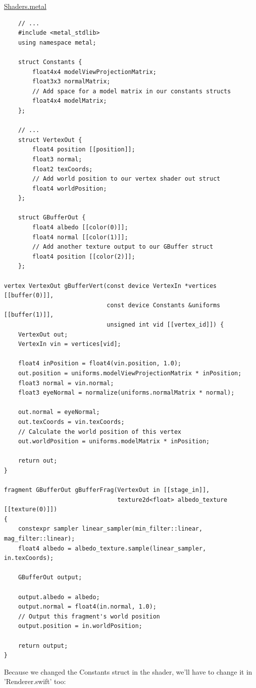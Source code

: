\documentclass[11pt]{article}
\begin{document}
\uline{Shaders.metal}
\begin{verbatim}
    // ...
    #include <metal_stdlib>
    using namespace metal;

    struct Constants {
        float4x4 modelViewProjectionMatrix;
        float3x3 normalMatrix;
        // Add space for a model matrix in our constants structs
        float4x4 modelMatrix;
    };

    // ...
    struct VertexOut {
        float4 position [[position]];
        float3 normal;
        float2 texCoords;
        // Add world position to our vertex shader out struct
        float4 worldPosition;
    };

    struct GBufferOut {
        float4 albedo [[color(0)]];
        float4 normal [[color(1)]];
        // Add another texture output to our GBuffer struct
        float4 position [[color(2)]];
    };

vertex VertexOut gBufferVert(const device VertexIn *vertices [[buffer(0)]],
                             const device Constants &uniforms [[buffer(1)]],
                             unsigned int vid [[vertex_id]]) {
    VertexOut out;
    VertexIn vin = vertices[vid];

    float4 inPosition = float4(vin.position, 1.0);
    out.position = uniforms.modelViewProjectionMatrix * inPosition;
    float3 normal = vin.normal;
    float3 eyeNormal = normalize(uniforms.normalMatrix * normal);

    out.normal = eyeNormal;
    out.texCoords = vin.texCoords;
    // Calculate the world position of this vertex
    out.worldPosition = uniforms.modelMatrix * inPosition;

    return out;
}

fragment GBufferOut gBufferFrag(VertexOut in [[stage_in]],
                                texture2d<float> albedo_texture [[texture(0)]])
{
    constexpr sampler linear_sampler(min_filter::linear, mag_filter::linear);
    float4 albedo = albedo_texture.sample(linear_sampler, in.texCoords);

    GBufferOut output;

    output.albedo = albedo;
    output.normal = float4(in.normal, 1.0);
    // Output this fragment's world position
    output.position = in.worldPosition;

    return output;
}

\end{verbatim}

Because we changed the Constants struct in the shader, we'll have to change it in 'Renderer.swift' too:
\end{document}
